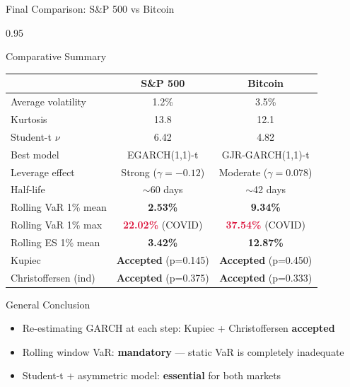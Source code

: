 \documentclass[9pt, aspectratio=169, t]{beamer}
\begin{document}
\begin{frame}{Final Comparison: S\&P 500 vs Bitcoin}
    \begin{cminipage}{0.95\textwidth}
    \vspace{-0.3cm}
    {\small
    \begin{block}{Comparative Summary}
        \vspace{-0.1cm}
        \begin{center}
        {\footnotesize
        \begin{tabular}{lcc}
            \toprule
            & \textbf{S\&P 500} & \textbf{Bitcoin} \\
            \midrule
            Average volatility & 1.2\% & 3.5\% \\
            Kurtosis & 13.8 & 12.1 \\
            Student-t $\nu$ & 6.42 & 4.82 \\
            Best model & EGARCH(1,1)-t & GJR-GARCH(1,1)-t \\
            Leverage effect & Strong ($\gamma = -0.12$) & Moderate ($\gamma = 0.078$) \\
            Half-life & $\sim$60 days & $\sim$42 days \\
            Rolling VaR 1\% mean & \textcolor{Forest}{\textbf{2.53\%}} & \textcolor{Forest}{\textbf{9.34\%}} \\
            Rolling VaR 1\% max & \textcolor{Crimson}{\textbf{22.02\%}} (COVID) & \textcolor{Crimson}{\textbf{37.54\%}} (COVID) \\
            Rolling ES 1\% mean & \textcolor{Forest}{\textbf{3.42\%}} & \textcolor{Forest}{\textbf{12.87\%}} \\
            Kupiec & \textcolor{Forest}{\textbf{Accepted}} (p=0.145) & \textcolor{Forest}{\textbf{Accepted}} (p=0.450) \\
            Christoffersen (ind) & \textcolor{Forest}{\textbf{Accepted}} (p=0.375) & \textcolor{Forest}{\textbf{Accepted}} (p=0.333) \\
            \bottomrule
        \end{tabular}
        }
        \end{center}
    \end{block}
    \vspace{-0.1cm}
    \begin{alertblock}{General Conclusion}
        \begin{itemize}\setlength{\itemsep}{0pt}
            \item Re-estimating GARCH at each step: Kupiec + Christoffersen \textbf{accepted}
            \item Rolling window VaR: \textbf{mandatory} --- static VaR is completely inadequate
            \item Student-t + asymmetric model: \textbf{essential} for both markets
        \end{itemize}
    \end{alertblock}
    }
    \end{cminipage}
\end{frame}
\end{document}
